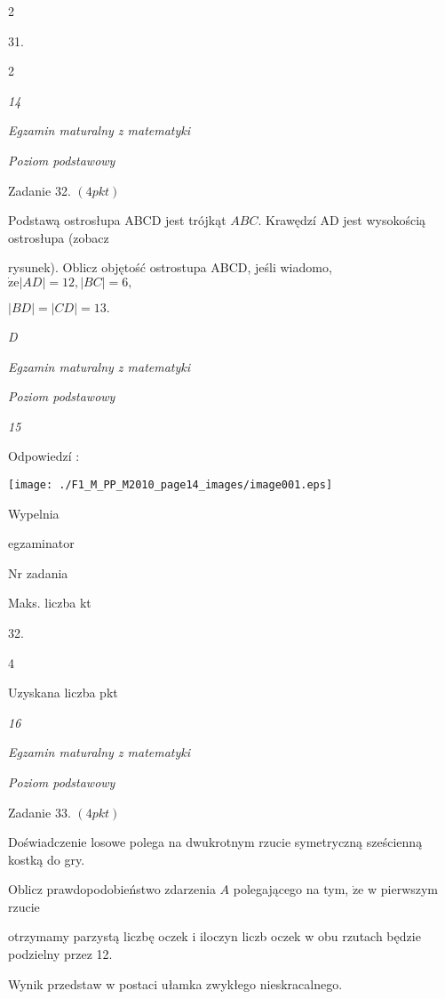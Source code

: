 \documentclass[a4paper,12pt]{article}
\begin{document}
2

31.

2





{\it 14}

{\it Egzamin maturalny z matematyki}

{\it Poziom podstawowy}

Zadanie 32. $(4pkt)$

Podstawą ostrosłupa ABCD jest trójkąt $ABC$. Krawędzí AD jest wysokością ostrosłupa (zobacz

rysunek). Oblicz objętość ostrostupa ABCD, jeśli wiadomo, $\dot{\mathrm{z}}\mathrm{e} |AD|=12, |BC|=6,$

$|BD|=|CD|=13.$

{\it D}





{\it Egzamin maturalny z matematyki}

{\it Poziom podstawowy}

{\it 15}

Odpowiedzí :
\begin{center}
\texttt{[image: ./F1\_M\_PP\_M2010\_page14\_images/image001.eps]}
\end{center}
Wypelnia

egzaminator

Nr zadania

Maks. liczba kt

32.

4

Uzyskana liczba pkt





{\it 16}

{\it Egzamin maturalny z matematyki}

{\it Poziom podstawowy}

Zadanie 33. $(4pkt)$

Doświadczenie losowe polega na dwukrotnym rzucie symetryczną sześcienną kostką do gry.

Oblicz prawdopodobieństwo zdarzenia $A$ polegającego na tym, $\dot{\mathrm{z}}\mathrm{e}$ w pierwszym rzucie

otrzymamy parzystą liczbę oczek i iloczyn liczb oczek w obu rzutach będzie podzielny przez 12.

Wynik przedstaw w postaci ułamka zwykłego nieskracalnego.
\end{document}
